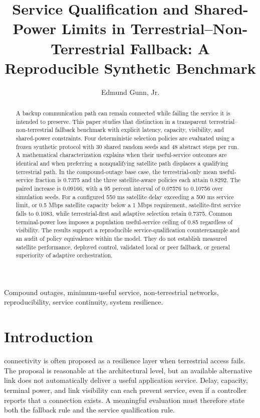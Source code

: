 \documentclass{IEEEoj}
\title{Service Qualification and Shared-Power Limits in Terrestrial--Non-Terrestrial Fallback: A Reproducible Synthetic Benchmark}
\author{Edmund Gunn, Jr.}
\affil{gunnchOS Research}
\def\draftfoot{\hbox to \textwidth{\scriptsize Owner-review draft -- not submitted or peer reviewed\hfill\thepage}}
\begin{document}
\pagestyle{headings}
\makeatletter
\def\@oddfoot{\draftfoot}\let\@evenfoot\@oddfoot
\makeatother
\begin{abstract}
A backup communication path can remain connected while failing the service it is intended to preserve. This paper studies that distinction in a transparent terrestrial--non-terrestrial fallback benchmark with explicit latency, capacity, visibility, and shared-power constraints. Four deterministic selection policies are evaluated using a frozen synthetic protocol with 30 shared random seeds and 48 abstract steps per run. A mathematical characterization explains when their useful-service outcomes are identical and when preferring a nonqualifying satellite path displaces a qualifying terrestrial path. In the compound-outage base case, the terrestrial-only mean useful-service fraction is 0.7375 and the three satellite-aware policies each attain 0.8292. The paired increase is 0.09166, with a 95 percent interval of 0.07576 to 0.10756 over simulation seeds. For a configured 550 ms satellite delay exceeding a 500 ms service limit, or 0.5 Mbps satellite capacity below a 1 Mbps requirement, satellite-first service falls to 0.1083, while terrestrial-first and adaptive selection retain 0.7375. Common terminal-power loss imposes a population useful-service ceiling of 0.85 regardless of visibility. The results support a reproducible service-qualification counterexample and an audit of policy equivalence within the model. They do not establish measured satellite performance, deployed control, validated local or peer fallback, or general superiority of adaptive orchestration.
\end{abstract}
\begin{IEEEkeywords}
Compound outages, minimum-useful service, non-terrestrial networks, reproducibility, service continuity, system resilience.
\end{IEEEkeywords}
\maketitle

\section{Introduction}
 connectivity is often proposed as a resilience layer when terrestrial access fails. The proposal is reasonable at the architectural level, but an available alternative link does not automatically deliver a useful application service. Delay, capacity, terminal power, and link visibility can each prevent service, even if a controller reports that a connection exists. A meaningful evaluation must therefore state both the fallback rule and the service qualification rule.
\end{document}
